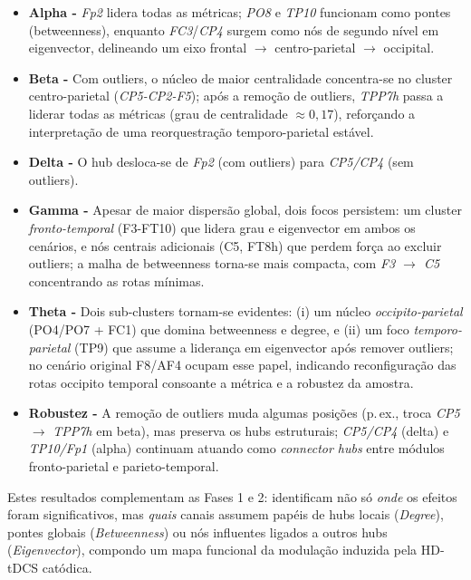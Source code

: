 \begin{itemize}
    \item \textbf{Alpha -} \textit{Fp2} lidera todas as métricas; \textit{PO8} e \textit{TP10} funcionam como pontes (betweenness), enquanto \textit{FC3}/\textit{CP4} surgem como nós de segundo nível em eigenvector, delineando um eixo frontal $\rightarrow$ centro-parietal $\rightarrow$ occipital.
    \item \textbf{Beta -} Com outliers, o núcleo de maior centralidade concentra-se no cluster centro-parietal (\textit{CP5-CP2-F5}); após a remoção de outliers, \textit{TPP7h} passa a liderar todas as métricas (grau de centralidade $\approx 0{,}17$), reforçando a interpretação de uma reorquestração temporo-parietal estável.
    \item \textbf{Delta -} O hub desloca-se de \textit{Fp2} (com outliers) para \textit{CP5/CP4} (sem outliers).
    \item \textbf{Gamma -} Apesar de maior dispersão global, dois focos persistem: um cluster \emph{fronto-temporal} (F3-FT10) que lidera grau e eigenvector em ambos os cenários, e nós centrais adicionais (C5, FT8h) que perdem força ao excluir outliers; a malha de betweenness torna-se mais compacta, com \textit{F3 $\rightarrow$ C5} concentrando as rotas mínimas.
    \item \textbf{Theta -} Dois sub-clusters tornam-se evidentes: (i) um núcleo \emph{occipito-parietal} (PO4/PO7 + FC1) que domina betweenness e degree, e (ii) um foco \emph{temporo-parietal} (TP9) que assume a liderança em eigenvector após remover outliers; no cenário original F8/AF4 ocupam esse papel, indicando reconfiguração das rotas occipito \leftrightarrow  temporal consoante a métrica e a robustez da amostra.
    \item \textbf{Robustez -} A remoção de outliers muda algumas posições (p.\,ex., troca \textit{CP5} $\rightarrow$ \textit{TPP7h} em beta), mas preserva os hubs estruturais; \textit{CP5/CP4} (delta) e \textit{TP10/Fp1} (alpha) continuam atuando como \emph{connector hubs} entre módulos fronto-parietal e parieto-temporal.
\end{itemize}

Estes resultados complementam as Fases 1 e 2: identificam não só \emph{onde} os efeitos foram significativos, mas \emph{quais} canais assumem papéis de hubs locais (\textit{Degree}), pontes globais (\textit{Betweenness}) ou nós influentes ligados a outros hubs (\textit{Eigenvector}), compondo um mapa funcional da modulação induzida pela HD-tDCS catódica.

